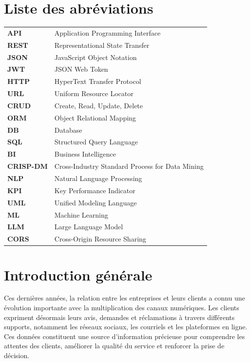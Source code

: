 \documentclass[12pt,a4paper,oneside]{report}
\renewcommand{\listfigurename}{}
\begin{document}
\renewcommand{\listfigurename}{Liste des figures}
\listoffigures
\clearpage

\listoftables
\clearpage

\chapter*{Liste des abréviations}
\begin{tabular}{>{\bfseries}p{3cm} p{10cm}}
API & Application Programming Interface \\
REST & Representational State Transfer \\
JSON & JavaScript Object Notation \\
JWT & JSON Web Token \\
HTTP & HyperText Transfer Protocol \\
URL & Uniform Resource Locator \\
CRUD & Create, Read, Update, Delete \\
ORM & Object Relational Mapping \\
DB & Database \\
SQL & Structured Query Language \\
BI & Business Intelligence \\
CRISP-DM & Cross-Industry Standard Process for Data Mining \\
NLP & Natural Language Processing \\
KPI & Key Performance Indicator \\
UML & Unified Modeling Language \\
ML & Machine Learning \\
LLM & Large Language Model \\
CORS & Cross-Origin Resource Sharing \\
\end{tabular}
\clearpage


\chapter*{Introduction générale}
\vspace{-0.5cm}
\enlargethispage{2\baselineskip}

\noindent Ces dernières années, la relation entre les entreprises et leurs clients a connu une évolution importante avec la multiplication des canaux numériques. Les clients expriment désormais leurs avis, demandes et réclamations à travers différents supports, notamment les réseaux sociaux, les courriels et les plateformes en ligne. Ces données constituent une source d’information précieuse pour comprendre les attentes des clients, améliorer la qualité du service et renforcer la prise de décision.
\end{document}

